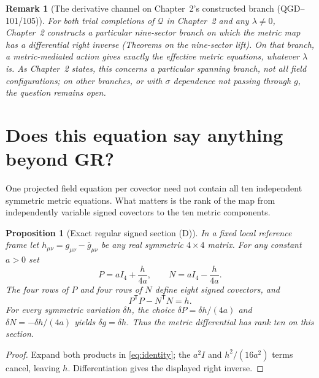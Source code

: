 \documentclass[11pt,a4paper]{article}
\newtheorem{proposition}[theorem]{Proposition}
\newtheorem{remark}[theorem]{Remark}
\begin{document}
\begin{remark}[The derivative channel on Chapter~2's constructed branch (QGD--101/105)]
\label{rem:Q-absorbed}
For both trial completions of $\mathcal Q$ in Chapter~2 and any $\lambda\neq0$,
Chapter~2 constructs a particular nine-sector branch on which the metric map has
a differential right inverse (Theorems on the nine-sector lift). On that branch,
a metric-mediated action gives exactly the effective metric equations, whatever
$\lambda$ is. As Chapter~2 states, this concerns a particular spanning branch,
not all field configurations; on other branches, or with $\sigma$ dependence not
passing through $g$, the question remains open.
\end{remark}

\section{Does this equation say anything beyond GR?}
\label{sec:equivalence}
One projected field equation per covector need not contain all ten
independent symmetric metric equations. What matters is the rank of
the map from independently variable signed covectors to the ten
metric components.

\begin{proposition}[Exact regular signed section (D)]
\label{prop:section}
In a fixed local reference frame let $h_{\mu\nu}
=g_{\mu\nu}-\bar g_{\mu\nu}$ be any real symmetric $4\times4$
matrix. For any constant $a>0$ set
\begin{equation}\label{eq:PN}
\boxed{P=aI_4+\frac{h}{4a},\qquad
N=aI_4-\frac{h}{4a}.}
\end{equation}
The four rows of $P$ and four rows of $N$ define eight signed
covectors, and
\begin{equation}\label{eq:identity}
\boxed{P^{\mathsf T}P-N^{\mathsf T}N=h.}
\end{equation}
For every symmetric variation $\delta h$, the choice
$\delta P=\delta h/(4a)$ and $\delta N=-\delta h/(4a)$
yields $\delta g=\delta h$. Thus the metric differential has rank ten
on this section.
\end{proposition}
\begin{proof}
Expand both products in \eqref{eq:identity}; the $a^2I$
and $h^2/(16a^2)$ terms cancel, leaving $h$.
Differentiation gives the displayed right inverse.
\end{proof}
\end{document}
